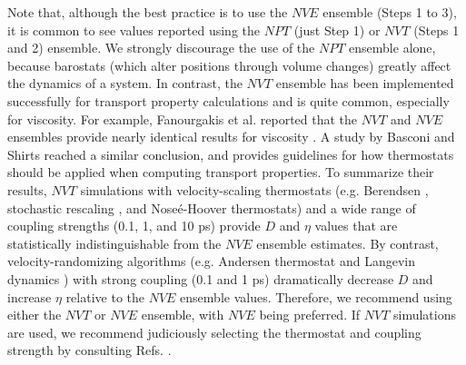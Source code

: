 \documentclass[9pt,bestpractices]{livecoms}
\begin{document}

Note that, although the best practice is to use the $NVE$ ensemble (Steps 1 to 3), it is common to see values reported using the $NPT$ (just Step 1) or $NVT$ (Steps 1 and 2) ensemble. We strongly discourage the use of the $NPT$ ensemble alone, because barostats (which alter positions through volume changes) greatly affect the dynamics of a system. In contrast, the $NVT$ ensemble has been implemented successfully for transport property calculations and is quite common, especially for viscosity. For example, Fanourgakis et al. reported that the $NVT$ and $NVE$ ensembles provide nearly identical results for viscosity \cite{Fanourgakis2012}. A study by Basconi and Shirts \cite{Shirts2013} reached a similar conclusion, and provides guidelines for how thermostats should be applied when computing transport properties. To summarize their results, $NVT$ simulations with velocity-scaling thermostats (e.g. Berendsen \cite{Berendsen1984}, stochastic rescaling \cite{Bussi2007}, and Nose{\'e}-Hoover \cite{Nose1984} thermostats) and a wide range of coupling strengths (0.1, 1, and 10 ps) provide $D$ and $\eta$ values that are statistically indistinguishable from the $NVE$ ensemble estimates. By contrast, velocity-randomizing algorithms (e.g. Andersen thermostat \cite{Andersen1980} and Langevin dynamics \cite{Hess2008}) with strong coupling (0.1 and 1 ps) dramatically decrease $D$ and increase $\eta$ relative to the $NVE$ ensemble values. Therefore, we recommend using either the $NVT$ or $NVE$ ensemble, with $NVE$ being preferred. If $NVT$ simulations are used, we recommend judiciously selecting the thermostat and coupling strength by consulting Refs. \cite{Fanourgakis2012,Shirts2013}.


\end{document}
